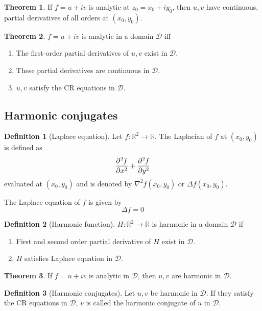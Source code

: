 \documentclass[10pt, a4paper]{extarticle}
\theoremstyle{definition}
\newtheorem{thm}{Theorem}
\newtheorem{defn}{Definition}
\begin{document}
\begin{thm}\label{highorder}
	If $f=u+iv$ is analytic at $z_0=x_0+iy_0$, then $u,v$ have continuous, partial derivatives of all orders at $(x_0,y_0)$.
\end{thm}

\begin{thm}
	$f=u+iv$ is analytic in a domain $\mathscr{D}$ iff
	\begin{enumerate}
		\item The first-order partial derivatives of $u,v$ exist in $\mathscr{D}$.
		\item These partial derivatives are continuous in $\mathscr{D}$.
		\item $u,v$ satisfy the CR equations in $\mathscr{D}$.
	\end{enumerate}
\end{thm}

\subsection{Harmonic conjugates}
\begin{defn}[Laplace equation]
	Let $f:\mathbb{R}^2\to\mathbb{R}$. The Laplacian of $f$ at $(x_0,y_0)$ is defined as
	\[\pdv[2]{f}{x}+\pdv[2]{f}{y}\]
	evaluated at $(x_0,y_0)$ and is denoted by $\nabla^2f(x_0,y_0)$ or $\Delta f(x_0,y_0)$.

	The Laplace equation of $f$ is given by
	\[\Delta f=0\]
\end{defn}

\begin{defn}[Harmonic function]
	$H:\mathbb{R}^2\to\mathbb{R}$ is harmonic in a domain $\mathscr{D}$ if
	\begin{enumerate}
		\item First and second order partial derivative of $H$ exist in $\mathscr{D}$.
		\item $H$ satisfies Laplace equation in $\mathscr{D}$.
	\end{enumerate}
\end{defn}

\begin{thm}
	If $f=u+iv$ is analytic in $\mathscr{D}$, then $u,v$ are harmonic in $\mathscr{D}$.
\end{thm}

\begin{defn}[Harmonic conjugates]
	Let $u,v$ be harmonic in $\mathscr{D}$. If they satisfy the CR equations in $\mathscr{D}$, $v$ is called the harmonic conjugate of $u$ in $\mathscr{D}$.
\end{defn}
\end{document}
